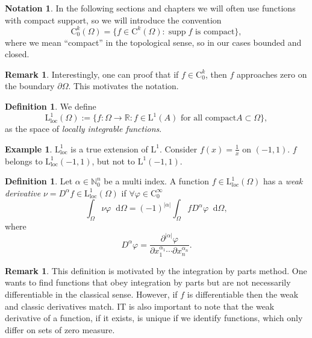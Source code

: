\documentclass[12pt,a4paper,twoside, open=right]{scrreprt}
\theoremstyle{definition}
\newtheorem{rem}[auf]{Remark}
\newtheorem{defn}[auf]{Definition}
\newtheorem{bsp}[auf]{Example}
\newtheorem{notation}[auf]{Notation}
\theoremstyle{plain}
\DeclareMathOperator{\supp}{supp} %
\newcommand{\abs}[1]{\left\vert #1\right\vert}
\newcommand{\rr}{\mathbb{R}}
\newcommand{\nn}{\mathbb{N}}
\newcommand{\D}{\mathop{}\!\mathrm{d}}
\begin{document}
\begin{notation}
    In the following sections and chapters we will often use functions with compact support, so we will introduce the convention
    \begin{equation}
        \mathrm{C}^k_0(\Omega)=\{f\in \mathrm{C}^k(\Omega)\colon \supp f \text{ is compact} \},
    \end{equation}
    where we mean \enquote{compact} in the topological sense, so in our cases bounded and closed.
\end{notation}
\begin{rem}
    Interestingly, one can proof that if $f\in \mathrm{C}^k_0$, then $f$ approaches zero on the boundary $\partial\Omega$. This motivates the notation.
\end{rem}
\begin{defn}
    We define 
    \begin{equation}
        \mathrm{L}^1_{\mathrm{loc}}(\Omega):=\{f\colon\Omega\to\rr\colon f\in \mathrm{L}^1(A) \text{ for all compact} A\subset\Omega \},
    \end{equation}
    as the space of \emph{locally integrable functions}.
\end{defn}
\begin{bsp}
    $\mathrm{L}^1_\mathrm{loc}$ is a true extension of $\mathrm{L}^1$. Consider $f(x)=\frac{1}{x}$ on $(-1,1)$. $f$ belongs to $\mathrm{L}^1_\mathrm{loc}(-1,1)$, but not to $\mathrm{L}^1(-1,1)$. 
\end{bsp}
\begin{defn}
    \label{defn:weakderivative}
    Let $\alpha\in\nn^n_0$ be a multi index. A function $f\in \mathrm{L}^1_{loc}(\Omega)$ has a \emph{weak derivative} $\nu=D^\alpha f\in \mathrm{L}^1_\mathrm{loc}(\Omega)$ if $\forall \varphi\in \mathrm{C}_0^\infty$
    \begin{equation}
        \int_\Omega\nu\varphi\D\Omega = (-1)^{\abs{\alpha}}\int_\Omega fD^\alpha\varphi \D\Omega,
    \end{equation}
    where 
    \begin{equation}
        D^\alpha\varphi=\frac{\partial^{\abs{\alpha}}\varphi}{\partial x_1^{\alpha_1}\dotsb\partial x_n^{\alpha_n}}.
    \end{equation}
\end{defn}
\begin{rem}
    This definition is motivated by the integration by parts method. One wants to find functions that obey integration by parts but are not necessarily differentiable in the classical sense. However, if $f$ is differentiable then the weak and classic derivatives match. IT is also important to note that the weak derivative of a function, if it exists, is unique if we identify functions, which only differ on sets of zero measure.
\end{rem}
\end{document}
